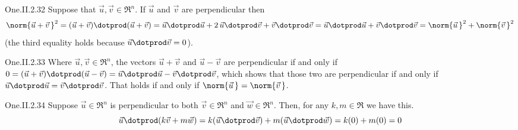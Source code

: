\begin{ans}{One.II.2.32}
      Suppose that \( \vec{u},\vec{v}\in\Re^n \).
      If \( \vec{u} \) and \( \vec{v} \) are perpendicular then
      \begin{equation*}
        \norm{\vec{u}+\vec{v}\,}^2
        =(\vec{u}+\vec{v})\dotprod(\vec{u}+\vec{v})
        =\vec{u}\dotprod\vec{u}+2\,\vec{u}\dotprod\vec{v}
               +\vec{v}\dotprod\vec{v}
        =\vec{u}\dotprod\vec{u}+\vec{v}\dotprod\vec{v}
        =\norm{\vec{u}\,}^2+\norm{\vec{v}\,}^2
      \end{equation*}
      (the third equality holds because \( \vec{u}\dotprod\vec{v}=0 \)).
    
\end{ans}
\begin{ans}{One.II.2.33}
      Where \( \vec{u},\vec{v}\in\Re^n \), the vectors
      \( \vec{u}+\vec{v} \) and \( \vec{u}-\vec{v} \) are perpendicular if and
      only if
      $0=(\vec{u}+\vec{v})\dotprod(\vec{u}-\vec{v})
         =\vec{u}\dotprod\vec{u}-\vec{v}\dotprod\vec{v}$,
      which shows that those two are perpendicular if and only if
      \( \vec{u}\dotprod\vec{u}=\vec{v}\dotprod\vec{v} \).
      That holds if and only if \( \norm{\vec{u}\,}=\norm{\vec{v}\,} \).
   
\end{ans}
\begin{ans}{One.II.2.34}
      Suppose \( \vec{u}\in\Re^n \) is perpendicular to both
      \( \vec{v}\in\Re^n \) and \( \vec{w}\in\Re^n \).
      Then, for any \( k,m\in\Re \) we have this.
      \begin{equation*}
        \vec{u}\dotprod(k\vec{v}+m\vec{w})
        =k(\vec{u}\dotprod\vec{v})+m(\vec{u}\dotprod\vec{w})
        =k(0)+m(0)=0
      \end{equation*}
    
\end{ans}
